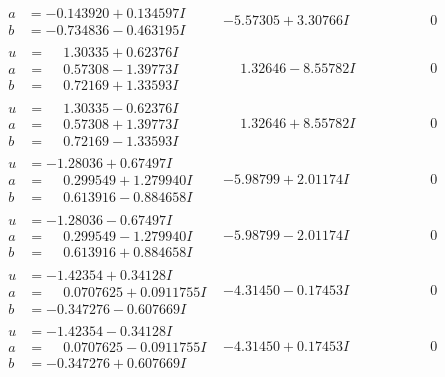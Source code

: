 \documentclass[1p]{elsarticle_modified}
\theoremstyle{definition}
\begin{document}
$$\begin{array}{c|c|c}
\begin{aligned}
a &= -0.143920 + 0.134597 I \\
b &= -0.734836 - 0.463195 I\end{aligned}
 & -5.57305 + 3.30766 I & \phantom{-0.000000 } 0 \\ \hline\begin{aligned}
u &= \phantom{-}1.30335 + 0.62376 I \\
a &= \phantom{-}0.57308 - 1.39773 I \\
b &= \phantom{-}0.72169 + 1.33593 I\end{aligned}
 & \phantom{-}1.32646 - 8.55782 I & \phantom{-0.000000 } 0 \\ \hline\begin{aligned}
u &= \phantom{-}1.30335 - 0.62376 I \\
a &= \phantom{-}0.57308 + 1.39773 I \\
b &= \phantom{-}0.72169 - 1.33593 I\end{aligned}
 & \phantom{-}1.32646 + 8.55782 I & \phantom{-0.000000 } 0 \\ \hline\begin{aligned}
u &= -1.28036 + 0.67497 I \\
a &= \phantom{-}0.299549 + 1.279940 I \\
b &= \phantom{-}0.613916 - 0.884658 I\end{aligned}
 & -5.98799 + 2.01174 I & \phantom{-0.000000 } 0 \\ \hline\begin{aligned}
u &= -1.28036 - 0.67497 I \\
a &= \phantom{-}0.299549 - 1.279940 I \\
b &= \phantom{-}0.613916 + 0.884658 I\end{aligned}
 & -5.98799 - 2.01174 I & \phantom{-0.000000 } 0 \\ \hline\begin{aligned}
u &= -1.42354 + 0.34128 I \\
a &= \phantom{-}0.0707625 + 0.0911755 I \\
b &= -0.347276 - 0.607669 I\end{aligned}
 & -4.31450 - 0.17453 I & \phantom{-0.000000 } 0 \\ \hline\begin{aligned}
u &= -1.42354 - 0.34128 I \\
a &= \phantom{-}0.0707625 - 0.0911755 I \\
b &= -0.347276 + 0.607669 I\end{aligned}
 & -4.31450 + 0.17453 I & \phantom{-0.000000 } 0 \\ \hline\begin{aligned}

\end{aligned}
\end{array}$$
\end{document}
